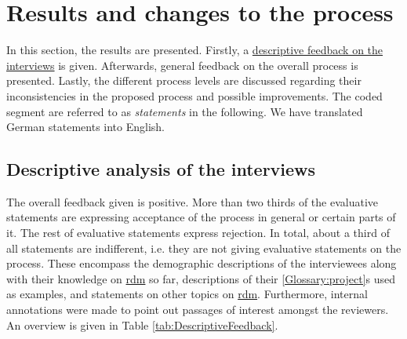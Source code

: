 \documentclass{bausteinefdm}
\begin{document}
\section{Results and changes to the process}
\label{Results}

In this section, the results are presented. 
Firstly, a \hyperref[DescriptiveFeedback]{descriptive feedback on the interviews} is given.
Afterwards, general feedback on the overall process is presented.
Lastly, the different process levels are discussed regarding their inconsistencies in the proposed process and possible improvements.
The coded segment are referred to as \textit{statements} in the following. 
We have translated German statements into English.

\subsection{Descriptive analysis of the interviews}
\label{DescriptiveFeedback}

The overall feedback given is positive.
More than two thirds of the evaluative statements are expressing acceptance of the process in general or certain parts of it.
The rest of evaluative statements express rejection.
In total, about a third of all statements are indifferent, i.e. they are not giving evaluative statements on the process.
These encompass the demographic descriptions of the interviewees along with their knowledge on \hyperref[Glossary:research data management level]{\ac{rdm}} so far, descriptions of their \ref{Glossary:project}s used as examples, and statements on other topics on \hyperref[Glossary:research data management level]{\ac{rdm}}.
Furthermore, internal annotations were made to point out passages of interest amongst the reviewers.
An overview is given in Table \ref{tab:DescriptiveFeedback}.
\end{document}
